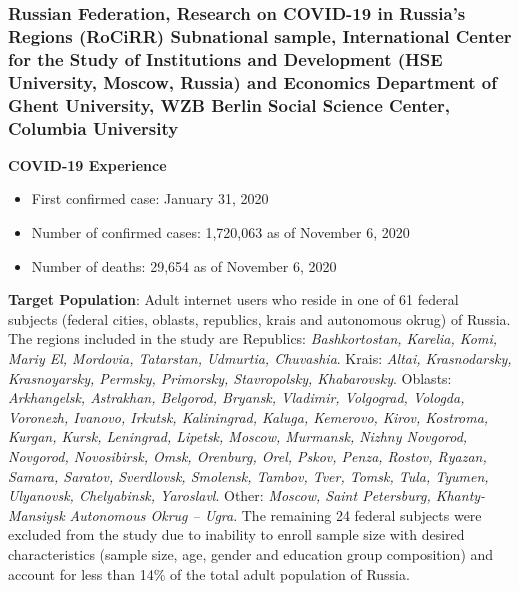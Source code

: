 \documentclass[
  12pt,
]{article}
\begin{document}
\hypertarget{russian-federation-research-on-covid-19-in-russias-regions-rocirr-subnational-sample-international-center-for-the-study-of-institutions-and-development-hse-university-moscow-russia-and-economics-department-of-ghent-university-wzb-berlin-social-science-center-columbia-university}{%
\subsubsection*{Russian Federation, Research on COVID-19 in Russia's Regions (RoCiRR) Subnational sample, International Center for the Study of Institutions and Development (HSE University, Moscow, Russia) and Economics Department of Ghent University, WZB Berlin Social Science Center, Columbia University}\label{russian-federation-research-on-covid-19-in-russias-regions-rocirr-subnational-sample-international-center-for-the-study-of-institutions-and-development-hse-university-moscow-russia-and-economics-department-of-ghent-university-wzb-berlin-social-science-center-columbia-university}}

\textbf{COVID-19 Experience}

\begin{itemize}
\item First confirmed case: January 31, 2020
\item Number of confirmed cases: 1,720,063 as of November 6, 2020 
\item Number of deaths:  29,654 as of November 6, 2020 
\end{itemize}

\textbf{Target Population}: Adult internet users who reside in one of 61 federal subjects (federal cities, oblasts, republics, krais and autonomous okrug) of Russia. The regions included in the study are Republics: \emph{Bashkortostan, Karelia, Komi, Mariy El, Mordovia, Tatarstan, Udmurtia, Chuvashia}. Krais: \emph{Altai, Krasnodarsky, Krasnoyarsky, Permsky, Primorsky, Stavropolsky, Khabarovsky}. Oblasts: \emph{Arkhangelsk, Astrakhan, Belgorod, Bryansk, Vladimir, Volgograd, Vologda, Voronezh, Ivanovo, Irkutsk, Kaliningrad, Kaluga, Kemerovo, Kirov, Kostroma, Kurgan, Kursk, Leningrad, Lipetsk, Moscow, Murmansk, Nizhny Novgorod, Novgorod, Novosibirsk, Omsk, Orenburg, Orel, Pskov, Penza, Rostov, Ryazan, Samara, Saratov, Sverdlovsk, Smolensk, Tambov, Tver, Tomsk, Tula, Tyumen, Ulyanovsk, Chelyabinsk, Yaroslavl}. Other: \emph{Moscow, Saint Petersburg, Khanty-Mansiysk Autonomous Okrug -- Ugra}. The remaining 24 federal subjects were excluded from the study due to inability to enroll sample size with desired characteristics (sample size, age, gender and education group composition) and account for less than 14\% of the total adult population of Russia.
\end{document}

